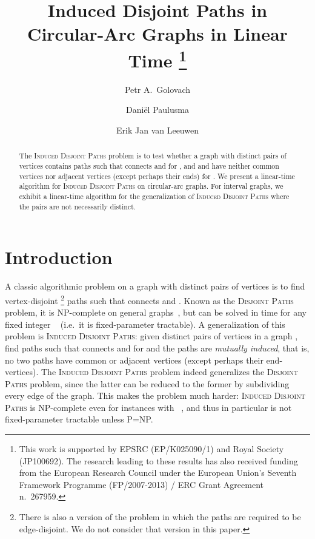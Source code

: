 \documentclass{llncs}
\newcommand{\sP}{{\sf P}}
\newcommand{\NP}{{\sf NP}}
\newcommand{\ie}{i.e.~}
\newcommand{\problemIDP}{\textsc{Induced Disjoint Paths}}
\newcommand{\problemDP}{\textsc{Disjoint Paths}}
\begin{document}
\title{Induced Disjoint Paths in\\ Circular-Arc Graphs in Linear Time
\thanks{This work is supported by EPSRC (EP/K025090/1) and Royal Society (JP100692).
The research leading to these results has also received funding from the European Research Council under the European Union's Seventh Framework Programme (FP/2007-2013) / ERC Grant Agreement n.\ 267959.}
}
\author{
Petr A.~Golovach
\and Dani\"el Paulusma
\and Erik Jan van Leeuwen
}
\maketitle
\thispagestyle{plain}
\setcounter{footnote}{0}

\begin{abstract}
The \problemIDP{} problem is to test whether a graph  with  distinct pairs of vertices  contains paths  such that  connects  and  for , and  and  have neither common vertices nor adjacent vertices (except perhaps their ends) for .
We present a linear-time algorithm for \problemIDP{} on circular-arc graphs.
For interval graphs, we exhibit a linear-time algorithm for the generalization of \problemIDP{} where the pairs  are not necessarily distinct.
\end{abstract}

\section{Introduction}\label{s-intro}
A classic algorithmic problem on a graph  with  distinct pairs of vertices  is to find vertex-disjoint
\footnote{There is also a version of the problem in which the paths are required to be edge-disjoint. We do not consider that version in this paper.} 
paths  such that  connects  and . Known as the \problemDP{} problem, it is \NP-complete on general graphs~\cite{Ka75}, but can be solved in  time for any fixed integer ~\cite{RS95} (\ie it is fixed-parameter tractable). A generalization of this problem is \problemIDP{}: given  distinct pairs of vertices  in a graph , find paths  such that  connects  and  for  and the paths are \emph{mutually induced}, that is, no two paths  have common or adjacent vertices (except perhaps their end-vertices). The \problemIDP{} problem indeed generalizes the \problemDP{} problem, since the latter can be reduced to the former by subdividing every edge of the graph. This makes the problem much harder: \problemIDP{} is \NP-complete even for instances with ~\cite{Bi91,Fe89}, and thus in particular is not fixed-parameter tractable unless \sP=\NP.
\end{document}

